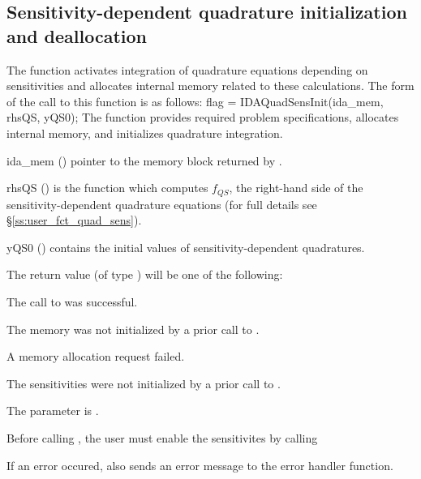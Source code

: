
\subsection{Sensitivity-dependent quadrature initialization and deallocation}%
\label{ss:quad_sens_init}

The function  activates integration of quadrature equations depending
on sensitivities and allocates internal memory related to these calculations.
The form of the call to this function is as follows:
{
flag = IDAQuadSensInit(ida\_mem, rhsQS, yQS0);
}
{
  The function  provides required problem specifications,
  allocates internal memory, and initializes quadrature integration.
}
{
  \begin{args}
  \item[ida\_mem] ()
    pointer to the {\idas} memory block returned by .
  \item[rhsQS] ()
    is the {\C} function which computes $f_{QS}$, the right-hand side of the 
    sensitivity-dependent quadrature equations
    (for full details see \S\ref{ss:user_fct_quad_sens}).
  \item[yQS0] ()
    contains the initial values of sensitivity-dependent quadratures.
  \end{args}
}
{
  The return value  (of type ) will be one of the following:
  \begin{args}
  \item[\Id{IDA\_SUCCESS}]
    The call to  was successful.
  \item[\Id{IDA\_MEM\_NULL}] 
    The {\idas} memory was not initialized by a prior call to .
  \item[\Id{IDA\_MEM\_FAIL}] 
    A memory allocation request failed.
  \item[\Id{IDA\_NO\_SENS}] 
    The sensitivities were not initialized by a prior call to .
  \item[\Id{IDA\_ILL\_INPUT}]
    The parameter  is .
  \end{args}
}
{
 
 {\warn} Before calling , the user must enable the sensitivites
  by calling 

  If an error occured,  also sends an error message to the
  error handler function.
}
